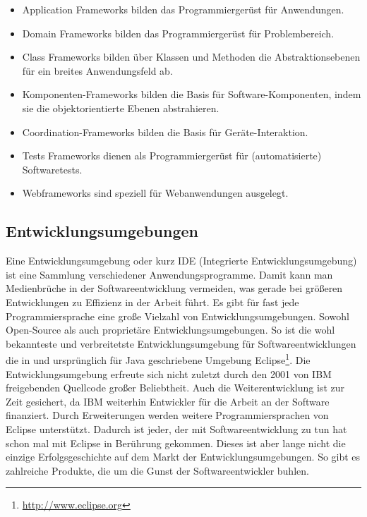 \newpage
{}
\begin{itemize}
  \item Application Frameworks 
        \newline bilden das Programmiergerüst für Anwendungen.
  \item Domain Frameworks 
        \newline bilden das Programmiergerüst für Problembereich.
  \item Class Frameworks 
        \newline bilden über Klassen und Methoden die Abstraktionsebenen 
        für ein breites Anwendungsfeld ab.
  \item Komponenten-Frameworks
        \newline bilden die Basis für Software-Komponenten, indem sie die 
        objektorientierte Ebenen abstrahieren.
  \item Coordination-Frameworks
        \newline bilden die Basis für Geräte-Interaktion.
  \item Tests Frameworks
        \newline dienen als Programmiergerüst für (automatisierte) Softwaretests.
  \item Webframeworks
        \newline sind speziell für Webanwendungen ausgelegt.
\end{itemize}

\subsection{Entwicklungsumgebungen}
Eine Entwicklungsumgebung oder kurz IDE (Integrierte Entwicklungsumgebung)
ist eine Sammlung verschiedener Anwendungsprogramme. Damit kann man 
Medienbrüche in der Softwareentwicklung vermeiden, was gerade bei größeren
Entwicklungen zu Effizienz in der Arbeit führt.
Es gibt für fast jede Programmiersprache eine große Vielzahl von 
Entwicklungsumgebungen. Sowohl Open-Source als auch proprietäre 
Entwicklungsumgebungen.
So ist die wohl bekannteste und verbreitetste Entwicklungsumgebung für
Softwareentwicklungen die in und ursprünglich für Java geschriebene 
Umgebung Eclipse\footnote{\url{http://www.eclipse.org}}. Die Entwicklungsumgebung
erfreute sich nicht zuletzt durch den 2001 von IBM freigebenden Quellcode
großer Beliebtheit. Auch die Weiterentwicklung ist zur Zeit gesichert, 
da IBM weiterhin Entwickler für die Arbeit an der Software finanziert. 
Durch Erweiterungen werden weitere Programmiersprachen
von Eclipse unterstützt. Dadurch ist jeder, der mit Softwareentwicklung
zu tun hat schon mal mit Eclipse in Berührung gekommen.  
Dieses ist aber lange nicht die einzige Erfolgsgeschichte auf dem Markt
der Entwicklungsumgebungen. So gibt es zahlreiche Produkte, die um die 
Gunst der Softwareentwickler buhlen. 

